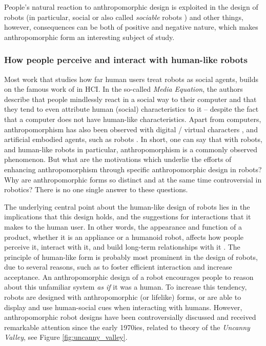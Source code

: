 \documentclass{frontiersSCNS} %
\begin{document}
People's natural reaction to anthropomorphic design is exploited in the design of 
robots (in particular, social or also called \textit{sociable} robots 
\citep{breazeal_sociable_2000}) and other things, however, consequences can be both of 
positive and negative nature, which makes anthropomorphic form an interesting subject 
of study.


\subsubsection{How people perceive and interact with human-like robots\\}
\label{sec:anthropomorphism-robotics}  
 
Most work that studies how far human users treat robots as social agents, builds on the 
famous work of \cite{reeves_media_1996} in HCI. In the so-called \textit{Media 
Equation}, the authors describe that people mindlessly react in a social way to their computer 
and that they tend to even attribute human (social) characteristics to it -- despite 
the fact that a computer does not have human-like characteristics. Apart from 
computers, anthropomorphism has also been observed with digital / virtual characters 
\citep{von_der_putten_it_2010}, and artificial embodied agents, 
such as robots \citep{rosenthal-vonderputten_experimental_2013}. 
In short, one can say that with robots, and human-like robots in 
particular, anthropomorphism is a commonly observed phenomenon. 
But what are the motivations which underlie the efforts of enhancing anthropomorphism 
through specific anthropomorphic design in robots? Why are anthropomorphic forms so 
distinct and at the same time controversial in robotics? There is no one single answer 
to these questions. 
 
The underlying central point about the human-like design of robots lies in the 
implications that this design holds, and the suggestions for interactions that
it makes to the human user. 
In other words, the appearance 
and function of a product, whether it is an appliance or a humanoid robot, affects how 
people perceive it, interact with it, and build long-term relationships with 
it \cite{bartneck_shaping_2004}. 
The principle of human-like form is probably most prominent in the design of robots, 
due to several reasons, such as to foster efficient interaction and increase 
acceptance. An anthropomorphic design of a robot encourages people to reason about this 
unfamiliar system \emph{as if} it was a human. To increase this tendency, robots are 
designed with anthropomorphic (or lifelike) forms, or are able to display and use 
human-social cues when interacting with humans.
However, anthropomorphic robot designs have been controversially discussed and received 
remarkable attention since the early 1970ies, related to \cite{mori_uncanny_1970} 
theory of the \textit{Uncanny Valley}, see Figure \ref{fig:uncanny_valley}.
\end{document}
